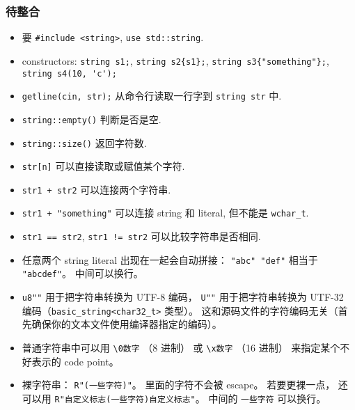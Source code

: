 
\begin{issues}
\issueDraft
\end{issues}

\subsubsection{待整合}
\begin{itemize}
\item 要 \verb`#include <string>`, \verb`use std::string`.
\item constructors: \verb`string s1;`, \verb`string s2{s1};`, \verb`string s3{"something"};`, \verb`string s4(10, 'c');`
\item \verb`getline(cin, str);` 从命令行读取一行字到 \verb`string str` 中.
\item \verb`string::empty()` 判断是否是空.
\item \verb`string::size()` 返回字符数.
\item \verb`str[n]` 可以直接读取或赋值某个字符.
\item \verb`str1 + str2` 可以连接两个字符串.
\item \verb`str1 + "something"` 可以连接 string 和 literal, 但不能是 \verb`wchar_t`.
\item \verb`str1 == str2`, \verb`str1 != str2` 可以比较字符串是否相同.
\item 任意两个 string literal 出现在一起会自动拼接： \verb`"abc" "def"` 相当于 \verb|"abcdef"|。 中间可以换行。
\item \verb|u8""| 用于把字符串转换为 UTF-8 编码， \verb|U""| 用于把字符串转换为 UTF-32 编码（\verb|basic_string<char32_t>| 类型）。 这和源码文件的字符编码无关（首先确保你的文本文件使用编译器指定的编码）。
\item 普通字符串中可以用 \verb|\0数字| （8 进制） 或 \verb|\x数字| （16 进制） 来指定某个不好表示的 code point。
\item 裸字符串： \verb|R"(一些字符)"|。 里面的字符不会被 escape。 若要更裸一点， 还可以用 \verb|R"自定义标志(一些字符)自定义标志"|。 中间的 \verb|一些字符| 可以换行。
\end{itemize}

